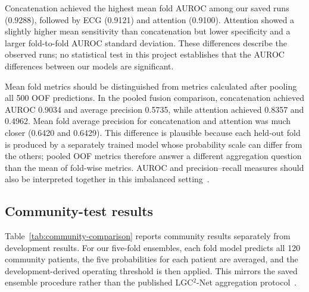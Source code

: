 \documentclass[11pt,a4paper]{article}
\begin{document}
Concatenation achieved the highest mean fold AUROC among our saved runs
(0.9288), followed by ECG (0.9121) and attention (0.9100). Attention showed a
slightly higher mean sensitivity than concatenation but lower specificity and
a larger fold-to-fold AUROC standard deviation. These differences describe the
observed runs; no statistical test in this project establishes that the AUROC
differences between our models are significant.

Mean fold metrics should be distinguished from metrics calculated after pooling
all 500 OOF predictions. In the pooled fusion comparison, concatenation
achieved AUROC 0.9034 and average precision 0.5735, while attention achieved
0.8357 and 0.4962. Mean fold average precision for concatenation and attention
was much closer (0.6420 and 0.6429). This difference is plausible because each
held-out fold is produced by a separately trained model whose probability scale
can differ from the others; pooled OOF metrics therefore answer a different
aggregation question than the mean of fold-wise metrics. AUROC and
precision--recall measures should also be interpreted together in this
imbalanced setting~\cite{fawcett2006roc,saito2015pr}.

\subsection{Community-test results}

Table~\ref{tab:community-comparison} reports community results separately from
development results. For our five-fold ensembles, each fold model predicts all
120 community patients, the five probabilities for each patient are averaged,
and the development-derived operating threshold is then applied. This mirrors
the saved ensemble procedure rather than the published LGC$^{2}$-Net
aggregation protocol~\cite{lgc2implementation}.

\begin{table}[htbp]
\centering
\caption{Community-cohort results. Sensitivity, specificity, and balanced
accuracy are percentages. Published values and our ensemble results use
different model aggregation procedures.}
\label{tab:community-comparison}
\begingroup
\setlength{\tabcolsep}{4pt}
\endgroup
\end{table}
\end{document}
